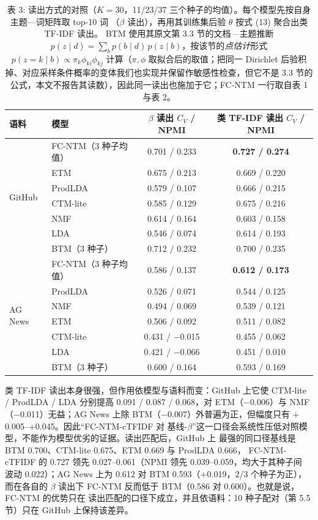 \documentclass{article}
\begin{document}
\begin{table}[t]
\centering
\caption{表 3: 读出方式的对照（$K=30$，11/23/37 三个种子的均值）。每个模型先按自身主题—词矩阵取 top-10 词
（$\beta$ 读出），再用其训练集后验 $\theta$ 按式 (13) 聚合出类 TF-IDF 读出。
BTM 使用其原文第 3.3 节的文档—主题推断
$p(z\mid d)=\sum_b p(b\mid d)\,p(z\mid b)$，按该节的\emph{点估计}形式
$p(z=k\mid b)\propto\pi_k\phi_{ki}\phi_{kj}$ 计算（$\pi,\phi$ 取拟合后的取值；把同一
Dirichlet 后验积掉、对应采样条件概率的变体我们也实现并保留作敏感性检查，但它不是 3.3 节的
公式，本文不报告其读数），因此同一读出也施加于它；FC-NTM 一行取自表 1
与表 2。}
\label{tab:fair}
\footnotesize
\setlength{\tabcolsep}{4pt}
\begin{tabular}{@{}llcc@{}}
\toprule
语料 & 模型 & $\beta$ 读出 $C_V$ / NPMI & 类 TF-IDF 读出 $C_V$ / NPMI \\
\midrule
 \multirow{7}{*}{GitHub}
 & FC-NTM（3 种子均值） & 0.701 / 0.233 & \textbf{0.727 / 0.274} \\
 & ETM & 0.675 / 0.213 & 0.669 / 0.220 \\
 & ProdLDA & 0.579 / 0.107 & 0.666 / 0.215 \\
 & CTM-lite & 0.585 / 0.129 & 0.675 / 0.216 \\
 & NMF & 0.614 / 0.164 & 0.603 / 0.158 \\
 & LDA & 0.546 / 0.074 & 0.614 / 0.193 \\
 & BTM（3 种子） & 0.712 / 0.232 & 0.700 / 0.235 \\
\midrule
 \multirow{7}{*}{AG News}
 & FC-NTM（3 种子均值） & 0.586 / 0.137 & \textbf{0.612 / 0.173} \\
 & ProdLDA & 0.526 / 0.071 & 0.544 / 0.125 \\
 & NMF & 0.494 / 0.069 & 0.539 / 0.121 \\
 & ETM & 0.506 / 0.092 & 0.511 / 0.082 \\
 & CTM-lite & 0.431 / $-$0.015 & 0.455 / 0.062 \\
 & LDA & 0.421 / $-$0.066 & 0.451 / 0.010 \\
 & BTM（3 种子） & 0.600 / 0.164 & 0.593 / 0.169 \\
\bottomrule
\end{tabular}
\end{table}

类 TF-IDF 读出本身很强，但作用依模型与语料而变：GitHub 上它使 CTM-lite / ProdLDA / LDA
分别提高 0.091 / 0.087 / 0.068，对 ETM（$-$0.006）与 NMF（$-$0.011）无益；AG News 上除
BTM（$-$0.007）外普遍为正，但幅度只有 $+$0.005--$+$0.045。因此“FC-NTM-cTFIDF 对
基线-$\beta$”这一口径会系统性压低对照模型，不能作为模型优劣的证据。读出匹配后，GitHub 上
最强的同口径基线是 BTM 0.700、CTM-lite 0.675、ETM 0.669 与 ProdLDA 0.666，
FC-NTM-cTFIDF 的 0.727 领先 0.027--0.061（NPMI 领先 0.039--0.059，均大于其种子间
波动 0.022）；AG News 上为 0.612 对 BTM 0.593（$+$0.019，2/3 个种子为正），而在各自的
$\beta$ 读出下 FC-NTM 反而低于 BTM（0.586 对 0.600）。也就是说，FC-NTM 的优势只在
读出匹配的口径下成立，并且依语料：10 种子配对（第 5.5 节）只在
GitHub 上保持该差异。
\end{document}
